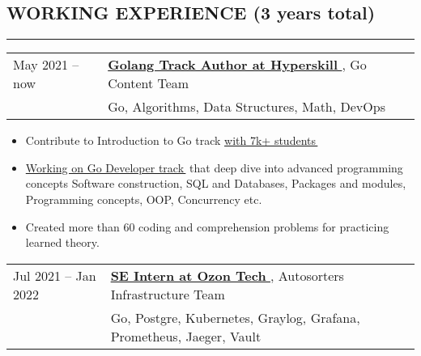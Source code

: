 \documentclass[11pt]{res} %
\let\orighref\href
\renewcommand{\href}[2]{\orighref{#1}{#2\,\faExternalLink}}
\begin{document}

    \address{August 2023 \\ Saint Petersburg, Russia}

    \address{
        \faEnvelopeO \, \href{mailto:misterzurg@gmail.com}{misterzurg@gmail.com} \\
        \faGithub    \, \href{https://github.com/MisterZurg}{github.com/MisterZurg} \\
        \faLinkedinSquare  \, \href{linkedin.com/in/misterzurg/}{linkedin.com/in/misterzurg}
    }

    \begin{resume}
        \section{\uppercase{Working Experience} (3 years total)}

        \begin{spacing}{0.3}
            \textcolor[RGB]{220,220,220}{\rule{\linewidth}{0.4pt}}
        \end{spacing}

        \begin{tabular}{ll}
            May 2021 -- now \qquad \qquad & \textbf{\href{https://hyperskill.org}{Golang Track Author at Hyperskill}}, Go Content Team \\
            & Go, Algorithms, Data Structures, Math, DevOps \\
        \end{tabular}

        \begin{itemize} \itemsep -2pt
            \item Contribute to Introduction to Go track \href{https://hyperskill.org/tracks/25?category=12}{with 7k+ students}
            \item \href{https://hyperskill.org/tracks/43?category=20}{Working on Go Developer track} that deep dive into advanced programming concepts Software construction, SQL and Databases, Packages and modules, Programming concepts, OOP, Concurrency etc.

            \item Created more than 60 coding and comprehension problems for practicing learned theory.
        \end{itemize}

        \begin{tabular}{ll}
            Jul 2021 -- Jan 2022 \quad & \textbf{\href{https://ozon.tech/}{SE Intern at Ozon Tech}}, Autosorters Infrastructure Team \\
            & Go, Postgre, Kubernetes, Graylog, Grafana, Prometheus, Jaeger, Vault \\
        \end{tabular}


\end{resume}
\end{document}
